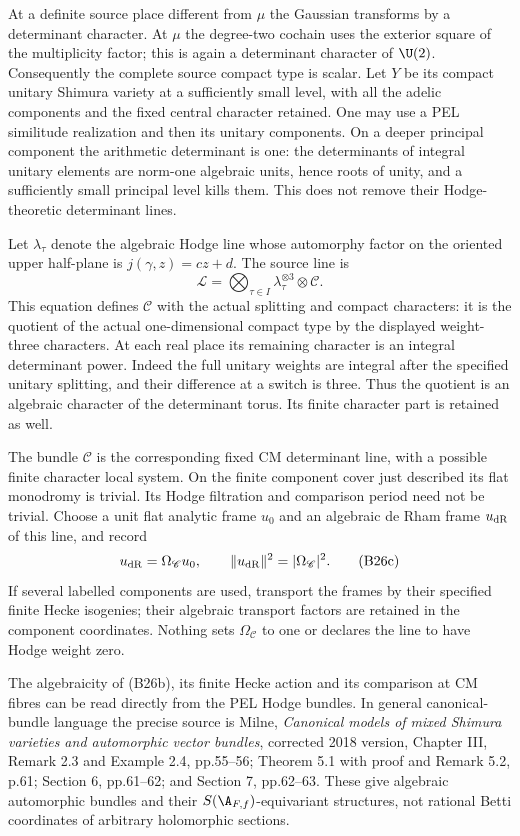 At a definite source place different from $\mu$ the Gaussian
transforms by a determinant character.  At $\mu$ the degree-two
cochain uses the exterior square of the multiplicity factor;
this is again a determinant character of $\U(2)$.  Consequently
the complete source compact type is scalar.  Let $Y$ be its
compact unitary Shimura variety at a sufficiently small level,
with all the adelic components and the fixed central character
retained.  One may use a PEL similitude realization and then its
unitary components.  On a deeper principal component the
arithmetic determinant is one: the determinants of integral
unitary elements are norm-one algebraic units, hence roots of
unity, and a sufficiently small principal level kills them.
This does not remove their Hodge-theoretic determinant lines.

Let $\lambda_\tau$ denote the algebraic Hodge line whose
automorphy factor on the oriented upper half-plane is
$j(\gamma,z)=cz+d$.  The source line is
\[
 \mathscr L=
       \bigotimes_{\tau\in I}\lambda_\tau^{\otimes3}
                  \otimes\mathscr C.
 \tag{B26b}
\]
This equation defines $\mathscr C$ with the actual splitting
and compact characters: it is the quotient of the actual
one-dimensional compact type by the displayed weight-three
characters.  At each real place its remaining character is
an integral determinant power.  Indeed the full unitary
weights are integral after the specified unitary splitting,
and their difference at a switch is three.  Thus the quotient
is an algebraic character of the determinant torus.  Its
finite character part is retained as well.

The bundle $\mathscr C$ is the corresponding fixed CM
determinant line, with a possible finite character local
system.  On the finite component cover just described its
flat monodromy is trivial.  Its Hodge filtration and comparison
period need not be trivial.  Choose a unit flat analytic frame
$u_0$ and an algebraic de Rham frame $u_{\rm dR}$ of this line,
and record
\[
                 u_{\rm dR}=\Omega_{\mathscr C}u_0,
             \qquad \|u_{\rm dR}\|^2=|\Omega_{\mathscr C}|^2.
 \tag{B26c}
\]
If several labelled components are used, transport the frames
by their specified finite Hecke isogenies; their algebraic
transport factors are retained in the component coordinates.
Nothing sets $\Omega_{\mathscr C}$ to one or declares the line
to have Hodge weight zero.

The algebraicity of (B26b), its finite Hecke action and its
comparison at CM fibres can be read directly from the PEL
Hodge bundles.  In general canonical-bundle language the
precise source is Milne, \emph{Canonical models of mixed
Shimura varieties and automorphic vector bundles}, corrected
2018 version, Chapter III, Remark 2.3 and Example 2.4,
pp.55--56; Theorem 5.1 with proof and Remark 5.2, p.61;
Section 6, pp.61--62; and Section 7, pp.62--63.
These give algebraic automorphic bundles and their
$S(\A_{F,f})$-equivariant structures, not rational Betti
coordinates of arbitrary holomorphic sections.

